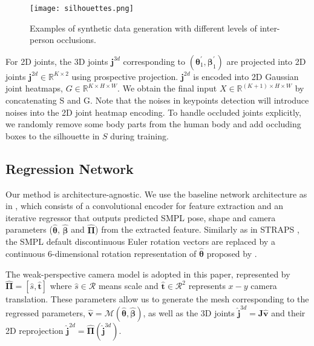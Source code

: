 \documentclass[journal]{IEEEtran}
\begin{document}
\begin{figure}[htbp]
    \centerline{\texttt{[image: silhouettes.png]}}
    \caption{Examples of synthetic data generation with different levels of inter-person occlusions. }
    \label{fig:samples}
\end{figure}

For 2D joints, the 3D joints $\bm{j}^{3d}$ corresponding to $(\bm{\theta}_1^{'}, \bm{\beta}_1^{'})$ are projected into 2D joints $\bm{j}^{2d} \in \mathbb{R}^{K \times 2}$ using prospective projection. $\bm{j}^{2d}$ is encoded into 2D Gaussian joint heatmaps, $G \in \mathbb{R}^{K\times H\times W}$. We obtain the final input $X \in \mathbb{R}^{(K+1)\times H \times W}$ by concatenating S and G. Note that the noises in keypoints detection will introduce noises into the 2D joint heatmap encoding. To handle occluded joints explicitly, we randomly remove some body parts from the human body and add occluding boxes to the silhouette in $S$ during training.

\subsection{Regression Network}
\label{sec:regression}
Our method is architecture-agnostic. We use the baseline network architecture as in \cite{ kanazawa2018end, kolotouros2019spin,STRAPS2020BMVC}, which consists of a convolutional encoder for feature extraction and an iterative regressor that outputs predicted SMPL pose, shape and camera parameters ($\hat{\bm{\theta}}$, $\hat{\bm{\beta}}$ and $\hat{\bm{\Pi}}$) from the extracted feature. Similarly as in STRAPS \cite{STRAPS2020BMVC}, the SMPL default discontinuous Euler rotation vectors are replaced by a continuous 6-dimensional rotation representation of $\hat{\bm{\theta}}$ proposed by \cite{zhou2019continuity}.

The weak-perspective camera model is adopted in this paper, represented by $\hat{\bm{\Pi}} = [\hat{s},\hat{\bm{t}}]$ where $\hat{s} \in \mathcal{R}$ means scale and $\hat{\bm{t}} \in \mathcal{R}^2$ represents ${x-y}$ camera translation. These parameters allow us to generate the mesh corresponding to the regressed parameters, $\hat{\bm{v}}=\mathcal{M}(\hat{\bm{\theta}}, \hat{\bm{\beta}})$, as well as the 3D joints $\hat{\bm{j}}^{3d} = \bm{J}\hat{\bm{v}}$ and their 2D reprojection $\hat{\bm{j}}^{2d}=\hat{\bm{\Pi}}(\hat{\bm{j}}^{3d})$.
\end{document}
